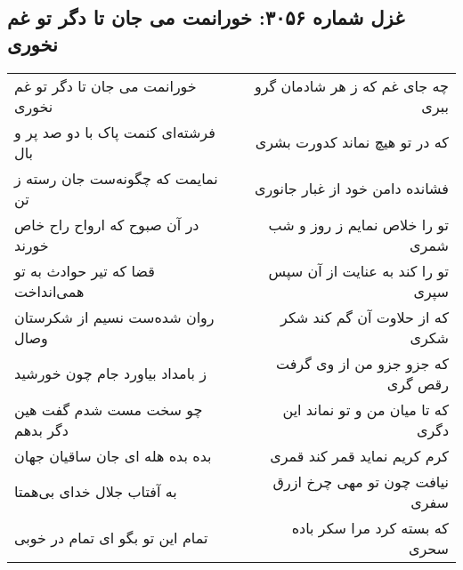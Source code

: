 \begin{center}
\section*{غزل شماره ۳۰۵۶: خورانمت می جان تا دگر تو غم نخوری}
\label{sec:3056}
\begin{longtable}{l p{0.5cm} r}
خورانمت می جان تا دگر تو غم نخوری
&&
چه جای غم که ز هر شادمان گرو ببری
\\
فرشته‌ای کنمت پاک با دو صد پر و بال
&&
که در تو هیچ نماند کدورت بشری
\\
نمایمت که چگونه‌ست جان رسته ز تن
&&
فشانده دامن خود از غبار جانوری
\\
در آن صبوح که ارواح راح خاص خورند
&&
تو را خلاص نمایم ز روز و شب شمری
\\
قضا که تیر حوادث به تو همی‌انداخت
&&
تو را کند به عنایت از آن سپس سپری
\\
روان شده‌ست نسیم از شکرستان وصال
&&
که از حلاوت آن گم کند شکر شکری
\\
ز بامداد بیاورد جام چون خورشید
&&
که جزو جزو من از وی گرفت رقص گری
\\
چو سخت مست شدم گفت هین دگر بدهم
&&
که تا میان من و تو نماند این دگری
\\
بده بده هله ای جان ساقیان جهان
&&
کرم کریم نماید قمر کند قمری
\\
به آفتاب جلال خدای بی‌همتا
&&
نیافت چون تو مهی چرخ ازرق سفری
\\
تمام این تو بگو ای تمام در خوبی
&&
که بسته کرد مرا سکر باده سحری
\\
\end{longtable}
\end{center}
